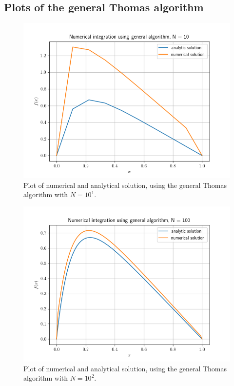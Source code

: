 \documentclass[english,notitlepage,reprint]{revtex4-1}  %
\begin{document}
\subsection{Plots of the general Thomas algorithm} \label{subsec:IV:A}
\begin{figure}[H]
	\centering
	\label{fig:iv:a:1}
	\includegraphics[width=\columnwidth]{plots/Figure_1.png}
	\caption{Plot of numerical and analytical solution, using the general Thomas algorithm with
	\(N=10^{1}\).}
\end{figure}

\begin{figure}[H]
	\centering
	\label{fig:iv:a:2}
	\includegraphics[width=\columnwidth]{plots/Figure_2.png}
	\caption{Plot of numerical and analytical solution, using the general Thomas algorithm with
	\(N=10^{2}\).}
\end{figure}
\end{document}

